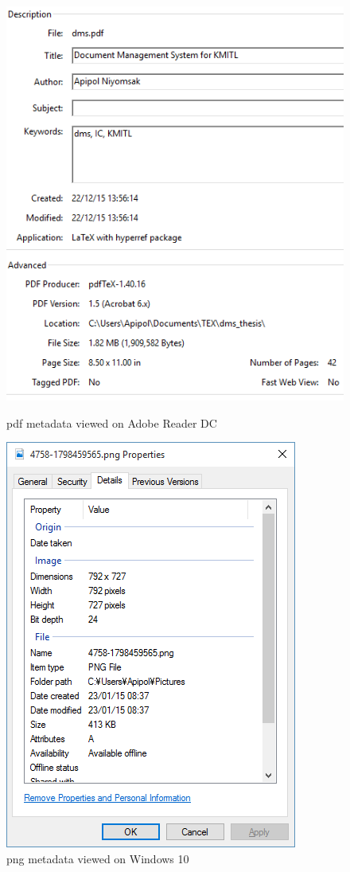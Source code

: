 \begin{figure}[h]
	\centering
	\begin{minipage}{0.45\textwidth}
		\centering
		\includegraphics*[scale=0.6]{res/bg-knowledge/metadata-ex-pdf}
		\caption{\acrfull{pdf} metadata viewed on Adobe Reader DC}
		\label{metadata-ex-pdf}
	\end{minipage} \hfill
	\begin{minipage}{0.45\textwidth}
		\centering
		\includegraphics*[scale=0.6]{res/bg-knowledge/metadata-ex-png}
		\caption{\acrfull{png} metadata viewed on Windows 10}
		\label{metadata-ex-png}
	\end{minipage} \hfill	
\end{figure}

